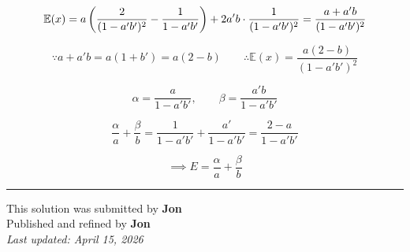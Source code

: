 ﻿\documentclass[12pt]{article}
\newcommand{\E}{\mathbb{E}}
\begin{document}
\[
\E(x)=a\left(\frac{2}{(1-a'b')^2}-\frac{1}{1-a'b'}\right)
+2a'b\cdot \frac{1}{(1-a'b')^2}=\frac{a+a'b}{(1-a'b')^2}\\
\]

\[
\because a+a'b=a(1+b')=a(2-b)\qquad \therefore \E(x)=\frac{a(2-b)}{(1-a'b')^2}
\]

\[
\alpha=\frac{a}{1-a'b'},\qquad \beta=\frac{a'b}{1-a'b'}
\]

\[
\frac{\alpha}{a}+\frac{\beta}{b}=\frac{1}{1-a'b'}+\frac{a'}{1-a'b'}=\frac{2-a}{1-a'b'}
\]

\[
\implies \boxed{E=\frac{\alpha}{a}+\frac{\beta}{b}}
\]



\bigskip
\hrule

\begin{center}
    This solution was submitted by \textbf{Jon}\\[4pt]
    Published and refined by \textbf{Jon}\\[8pt]
	\textit{Last updated: April 15, 2026}
\end{center}
\end{document}
